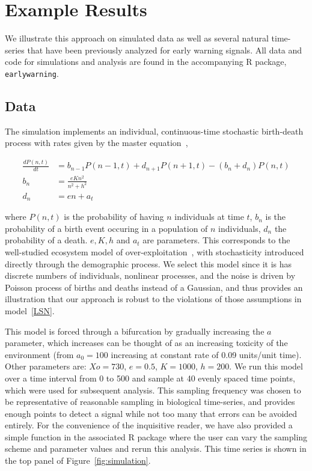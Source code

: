 \documentclass[authoryear,review,11pt]{elsarticle}
\begin{document}
\section{Example Results}
We illustrate this approach on simulated data as well as several natural time-series that have been previously analyzed for early warning signals.  All data and code for simulations and analysis are found in the accompanying R package, \verb|earlywarning|.


\subsection*{Data}
The simulation implements an individual, continuous-time stochastic birth-death process with rates given by the master equation~\citep{Gardiner2009},

\begin{align}
  \frac{dP(n,t)}{dt} &= b_{n-1} P(n-1,t) + d_{n+1}P(n+1,t) - (b_n+d_n) P(n,t)  \label{master} \\
    b_n &= \frac{e K n^2}{n^2 + h^2} \\
    d_n &= e n + a_t
\end{align}

where $P(n,t)$ is the probability of having $n$ individuals at time $t$, $b_n$ is the probability of a birth event occuring in a population of $n$ individuals, $d_n$ the probability of a death.  $e, K, h$ and $a_t$ are parameters.  
This corresponds to the well-studied ecosystem model of over-exploitation~\citep{Noy-Meir1975, May1977},
with stochasticity introduced directly through the demographic process.
We select this model since it is has discrete numbers of individuals, 
nonlinear processes, and the noise is driven by Poisson process of births and deaths instead of a Gaussian, 
and thus provides an illustration that our approach is robust to the violations of those
assumptions in model~\eqref{LSN}. 

This model is forced through a bifurcation by gradually increasing the $a$ parameter,
which increases can be thought of as an increasing toxicity of the environment
(from $a_0 = 100$ increasing at constant rate of 0.09 units/unit time).
Other parameters are: $Xo = 730$, $e = 0.5$, $K = 1000$, $h = 200$.
We run this model over a time interval from 0 to 500
and sample at 40 evenly spaced time points, which were used for subsequent analysis.
This sampling frequency was chosen to be representative of reasonable sampling in biological time-series,
and provides enough points to detect a signal while not too many that errors can be avoided entirely.  
For the convenience of the inquisitive reader, we have also provided a simple function in the
associated R package where the user can vary the sampling scheme and parameter values and rerun this analysis.
This time series is shown in the top panel of Figure~\ref{fig:simulation}.
\end{document}

